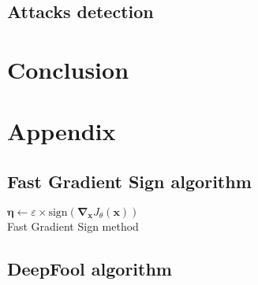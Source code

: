 \documentclass[11pt,twocolumn,letterpaper]{article}
\begin{document}
\paragraph{} 

\subsection{Attacks detection}

\paragraph{} 


\section{Conclusion}
\label{sec:conclusion}


\section{Appendix}
\label{sec:appendix}

\subsection{Fast Gradient Sign algorithm}

\begin{algorithm}
\SetAlgoLined
{}
\KwOutput{$\bm{\eta}$}
$\bm{\eta} \leftarrow \varepsilon \times \text{sign}(\bm{\nabla}_{\bm{x}} J_{\theta}(\bm{x}))$ \\
\caption{Fast Gradient Sign method}
\label{algo:fgs}
\end{algorithm}

\subsection{DeepFool algorithm}
\end{document}
